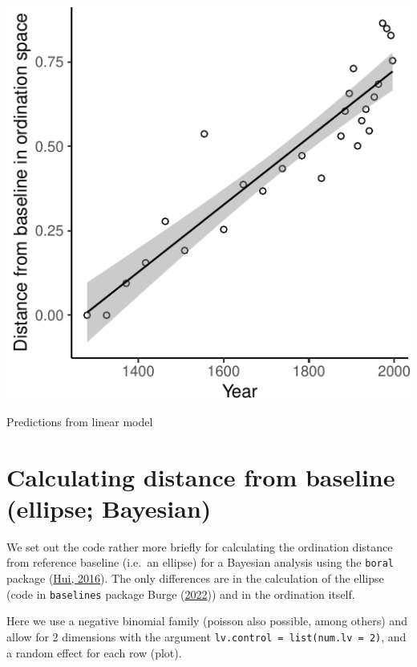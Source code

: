\documentclass[nofonts,]{tufte-handout}
\begin{document}
\begin{marginfigure}
\includegraphics{Technical-supplement_files/figure-latex/predictinglm-1} \caption[Predictions from linear model]{Predictions from linear model}\label{fig:predictinglm}
\end{marginfigure}

\hypertarget{calculating-distance-from-baseline-ellipse-bayesian}{%
\section{Calculating distance from baseline (ellipse;
Bayesian)}\label{calculating-distance-from-baseline-ellipse-bayesian}}

We set out the code rather more briefly for calculating the ordination
distance from reference baseline (i.e.~an ellipse) for a Bayesian
analysis using the \texttt{boral} package
(\protect\hyperlink{ref-hui16_boral}{Hui, 2016}). The only differences
are in the calculation of the ellipse (code in \texttt{baselines}
package Burge (\protect\hyperlink{ref-burge_2022_baselines}{2022})) and
in the ordination itself.

Here we use a negative binomial family (poisson also possible, among
others) and allow for 2 dimensions with the argument
\texttt{lv.control\ =\ list(num.lv\ =\ 2)}, and a random effect for each
row (plot).
\end{document}
